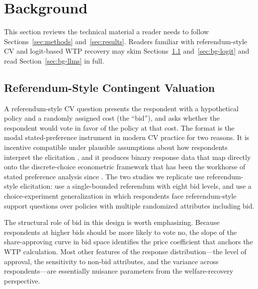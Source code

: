 \documentclass[12pt]{article}
\begin{document}
%

\section{Background}\label{sec:background}

This section reviews the technical material a reader needs to follow
Sections~\ref{sec:methods} and~\ref{sec:results}. Readers familiar with
referendum-style CV and logit-based WTP recovery may skim
Sections~\ref{sec:bg-cv} and~\ref{sec:bg-logit} and read
Section~\ref{sec:bg-llms} in full.

\subsection{Referendum-Style Contingent Valuation}\label{sec:bg-cv}

A referendum-style CV question presents the respondent with a hypothetical
policy and a randomly assigned cost (the ``bid''), and asks whether the
respondent would vote in favor of the policy at that cost. The format is
the modal stated-preference instrument in modern CV practice for two
reasons. It is incentive compatible under plausible assumptions about how
respondents interpret the elicitation \parencite{Carson2007}, and it
produces binary response data that map directly onto the discrete-choice
econometric framework that has been the workhorse of stated preference
analysis since \textcite{Hanemann1984}. The two studies we replicate use
referendum-style elicitation: \textcite{Aldy2012} use a single-bounded
referendum with eight bid levels, and \textcite{Giguere2020} use a
choice-experiment generalization in which respondents face referendum-style
support questions over policies with multiple randomized attributes
including bid.

The structural role of bid in this design is worth emphasizing. Because
respondents at higher bids should be more likely to vote no, the slope of
the share-approving curve in bid space identifies the price coefficient
that anchors the WTP calculation. Most other features of the response
distribution---the level of approval, the sensitivity to non-bid
attributes, and the variance across respondents---are essentially
nuisance parameters from the welfare-recovery perspective.
\end{document}

